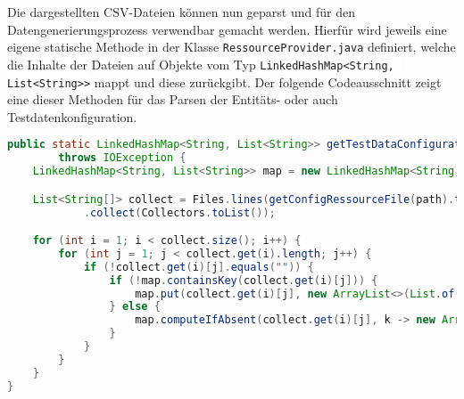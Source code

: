 Die dargestellten \ac{CSV}-Dateien können nun geparst und für den Datengenerierungsprozess verwendbar gemacht werden. Hierfür wird jeweils eine eigene statische Methode in der Klasse \colorbox{background}{\lstinline{RessourceProvider.java}} definiert, welche die Inhalte der Dateien auf Objekte vom Typ \colorbox{background}{\lstinline{LinkedHashMap<String, List<String>>}} mappt und diese zurückgibt. Der folgende Codeausschnitt zeigt eine dieser Methoden für das Parsen der Entitäts- oder auch Testdatenkonfiguration. 

\begin{lstlisting}[caption=Methode zum Parsen und Mappen der Testdatenkonfiguration, label=testdataParse,language=Java]
public static LinkedHashMap<String, List<String>> getTestDataConfiguration(String path)
		throws IOException {
	LinkedHashMap<String, List<String>> map = new LinkedHashMap<String, List<String>>();

	List<String[]> collect = Files.lines(getConfigRessourceFile(path).toPath()).map(line -> line.split(",|;"))
			.collect(Collectors.toList());

	for (int i = 1; i < collect.size(); i++) {
		for (int j = 1; j < collect.get(i).length; j++) {
			if (!collect.get(i)[j].equals("")) {
				if (!map.containsKey(collect.get(i)[j])) {
					map.put(collect.get(i)[j], new ArrayList<>(List.of(collect.get(i)[0])));
				} else {
					map.computeIfAbsent(collect.get(i)[j], k -> new ArrayList<String>()).add(collect.get(i)[0]);
				}
			}
		}
	}
}
\end{lstlisting}


